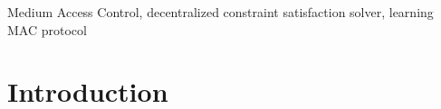 \documentclass[journal]{IEEEtran}
\begin{document}
\begin{IEEEkeywords}
Medium Access Control, decentralized constraint satisfaction solver, learning MAC protocol
\end{IEEEkeywords}






%
\IEEEpeerreviewmaketitle



\section{Introduction}
%
%
%
%


\end{document}
